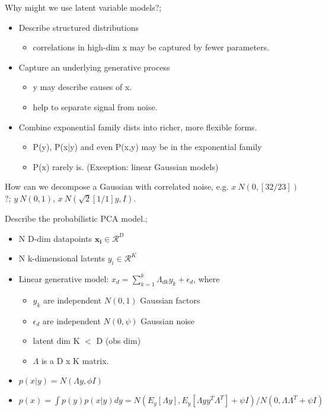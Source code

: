 \documentclass{article}
\begin{document}
Why might we use latent variable models?; \begin{itemize} \item Describe structured distributions \begin{itemize} \item correlations in high-dim x may be captured by fewer parameters.  \end{itemize} \item Capture an underlying generative process \begin{itemize} \item y may describe causes of x.  \item help to separate signal from noise.  \end{itemize} \item Combine exponential family dists into richer, more flexible forms.  \begin{itemize} \item P(y), P(x|y) and even P(x,y) may be in the exponential family \item P(x) rarely is. (Exception: linear Gaussian models) \end{itemize} \end{itemize}

How can we decompose a Gaussian with correlated noise, e.g. $x~N(0, [ 3 2 / 2 3])$?; $y~N(0,1)$, $x~N(\sqrt{2}[1 / 1]y, I)$.

Describe the probabilistic PCA model.; \begin{itemize} \item N D-dim datapoints $\mathbf{x_i} \in \mathcal{R}^D$ \item N k-dimensional latents $y_i \in \mathcal{R}^K$ \item Linear generative model: $x_d = \sum_{k=1}^k \Lambda_{dk}y_k + \epsilon_d$, where \begin{itemize} \item $y_k$ are independent $N(0,1)$ Gaussian factors \item $\epsilon_d$ are independent $N(0,\psi)$ Gaussian noise \item latent dim K $<$ D (obs dim) \item $\Lambda$ is a D x K matrix.  \end{itemize} \item $p(x|y) = N(\Lambda y,\phi I)$ \item $p(x) = \int p(y)p(x|y)dy = N(E_y[\Lambda y], E_y[\Lambda y y^T\Lambda^T]+\psi I)/N(0,\Lambda\Lambda^T+\psi I)$ \end{itemize}
\end{document}
